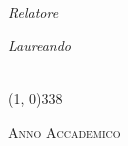 \begin{titlepage}
    \vspace{1cm}
    
    
    \begin{LARGE}
        \begin{center}
            \textbf{\myTitle}\\
        \end{center}
    \end{LARGE}
    
    
    \vspace{1.5cm}
    
    \begin{large}
        \begin{flushleft}
            \textit{Relatore}\\ 
            \vspace{5pt} 
            \profTitle \myProf
        \end{flushleft}
        
        \begin{flushright}
            \textit{Laureando}\\ 
            \vspace{5pt} 
            \myName\\
            \matricola
        \end{flushright}
    \end{large}
    \vspace{1.3cm}
    
    \line(1, 0){338} \\
    \begin{normalsize}
        \textsc{Anno Accademico \myAA}
    \end{normalsize}
    
    \vfill 
    
\end{titlepage}